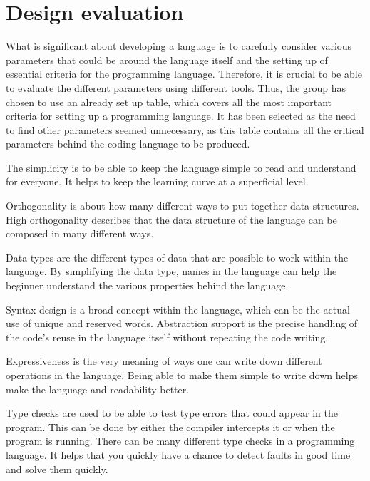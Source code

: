 \section{Design evaluation} \label{chap:design evaluation}
What is significant about developing a language is to carefully consider various parameters that could be around the language itself and the setting up of essential criteria for the programming language. 
Therefore, it is crucial to be able to evaluate the different parameters using different tools. Thus, the group has chosen to use an already set up table, which covers all the most important criteria for setting up a programming language. 
It has been selected as the need to find other parameters seemed unnecessary, as this table contains all the critical parameters behind the coding language to be produced.






The simplicity is to be able to keep the language simple to read and understand for everyone. It helps to keep the learning curve at a superficial level.

Orthogonality is about how many different ways to put together data structures. High orthogonality describes that the data structure of the language can be composed in many different ways.

Data types are the different types of data that are possible to work within the language. By simplifying the data type, names in the language can help the beginner understand the various properties behind the language.

Syntax design is a broad concept within the language, which can be the actual use of unique and reserved words.
Abstraction support is the precise handling of the code's reuse in the language itself without repeating the code writing.

Expressiveness is the very meaning of ways one can write down different operations in the language. Being able to make them simple to write down helps make the language and readability better.

Type checks are used to be able to test type errors that could appear in the program. This can be done by either the compiler intercepts it or when the program is running. There can be many different type checks in a programming language. It helps that you quickly have a chance to detect faults in good time and solve them quickly.

